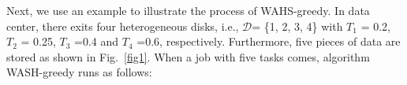 \documentclass[conference]{IEEEtran}
\begin{document}


Next, we use an example to illustrate the process of WAHS-greedy. In data center, there exits four heterogeneous disks, i.e., $\mathcal{D}$= \{1, 2, 3, 4\} with $T_1$ = 0.2,  $T_2$ = 0.25,  $T_3$ =0.4 and $T_4$ =0.6, respectively. Furthermore, five pieces of data are stored as shown in Fig.~\ref{fig1}. When a job with five tasks comes, algorithm WASH-greedy runs as follows: %
\end{document}

